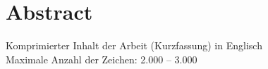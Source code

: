 \newpage
\section*{Abstract}
Komprimierter Inhalt der Arbeit (Kurzfassung) in Englisch
\\Maximale Anzahl der Zeichen: 2.000 – 3.000
\\
\\
\blindtext[1]